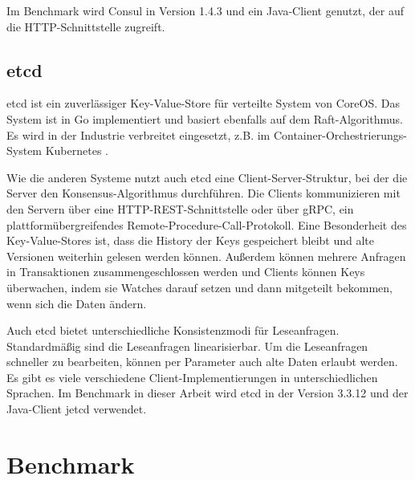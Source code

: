 Im Benchmark wird Consul in Version 1.4.3 und ein Java-Client \cite{consul-client} genutzt, der auf die HTTP-Schnittstelle zugreift.

\subsection{etcd}

etcd \cite{etcd} ist ein zuverlässiger Key-Value-Store für verteilte System von CoreOS. Das System ist in Go implementiert und basiert ebenfalls auf dem Raft-Algorithmus. Es wird in der Industrie verbreitet eingesetzt, z.B. im Container-Orchestrierungs-System Kubernetes \cite{kubernetes}.

Wie die anderen Systeme nutzt auch etcd eine Client-Server-Struktur, bei der die Server den Konsensus-Algorithmus durchführen. Die Clients kommunizieren mit den Servern über eine HTTP-REST-Schnittstelle oder über gRPC, ein plattformübergreifendes Remote-Procedure-Call-Protokoll. Eine Besonderheit des Key-Value-Stores ist, dass die History der Keys gespeichert bleibt und alte Versionen weiterhin gelesen werden können. Außerdem können mehrere Anfragen in Transaktionen zusammengeschlossen werden und Clients können Keys überwachen, indem sie Watches darauf setzen und dann mitgeteilt bekommen, wenn sich die Daten ändern.

Auch etcd bietet unterschiedliche Konsistenzmodi für Leseanfragen. Standardmäßig sind die Leseanfragen linearisierbar. Um die Leseanfragen schneller zu bearbeiten, können per Parameter auch alte Daten erlaubt werden. Es gibt es viele verschiedene Client\hyp{}Implementierungen in unterschiedlichen Sprachen. Im Benchmark in dieser Arbeit wird etcd in der Version 3.3.12 und der Java-Client jetcd \cite{jetcd} verwendet.

\section{Benchmark}

